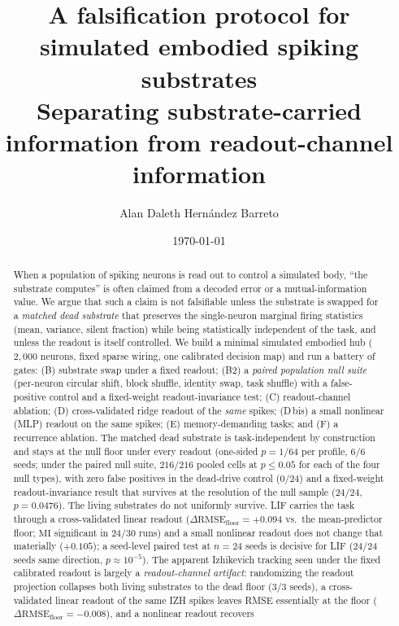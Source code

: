 \documentclass[10pt,a4paper]{article}
\title{\vspace{-1.5em}A falsification protocol for simulated embodied
spiking substrates\\[0.3em]
{\large Separating substrate-carried information from readout-channel
information}\vspace{-0.5em}}
\author{Alan Daleth Hernández Barreto}
\date{\today}
\newcommand{\RMSE}{\ensuremath{\mathrm{RMSE}}}
\newcommand{\MI}{\ensuremath{\mathrm{MI}}}
\begin{document}
\maketitle
\vspace{-3em}

\begin{abstract}
\noindent
When a population of spiking neurons is read out to control a simulated
body, ``the substrate computes'' is often claimed from a decoded error
or a mutual-information value. We argue that such a claim is not
falsifiable unless the substrate is swapped for a \emph{matched dead
substrate} that preserves the single-neuron marginal firing statistics
(mean, variance, silent fraction) while being statistically independent
of the task, and unless the readout is itself controlled. We build a
minimal simulated embodied hub ($2{,}000$ neurons, fixed sparse wiring,
one calibrated decision map) and run a battery of gates: (B) substrate
swap under a fixed readout; (B2) a \emph{paired population null suite}
(per-neuron circular shift, block shuffle, identity swap, task shuffle)
with a false-positive control and a fixed-weight readout-invariance
test; (C) readout-channel ablation; (D) cross-validated ridge readout of
the \emph{same} spikes; (D\,bis) a small nonlinear (MLP) readout on the
same spikes; (E) memory-demanding tasks; and (F) a recurrence ablation.
The matched dead substrate is task-independent by construction and stays
at the null floor under every readout (one-sided $p=1/64$ per profile,
$6/6$ seeds; under the paired null suite, $216/216$ pooled cells at
$p\le0.05$ for each of the four null types), with zero false positives
in the dead-drive control ($0/24$) and a fixed-weight
readout-invariance result that survives at the resolution of the null
sample ($24/24$, $p=0.0476$). The living substrates do not uniformly
survive. LIF carries the task through a cross-validated linear readout
($\Delta\RMSE_{\mathrm{floor}}=+0.094$ vs.\ the mean-predictor floor;
$\MI$ significant in $24/30$ runs) and a small nonlinear readout does
not change that materially ($+0.105$); a seed-level paired test at
$n=24$ seeds is decisive for LIF ($24/24$ seeds same direction,
$p\approx10^{-5}$). The apparent Izhikevich tracking seen under the fixed
calibrated readout is largely a \emph{readout-channel artifact}:
randomizing the readout projection collapses both living substrates to
the dead floor ($3/3$ seeds), a cross-validated linear readout of the
same IZH spikes leaves RMSE essentially at the floor
($\Delta\RMSE_{\mathrm{floor}}=-0.008$), and a nonlinear readout recovers

\end{abstract}
\end{document}
